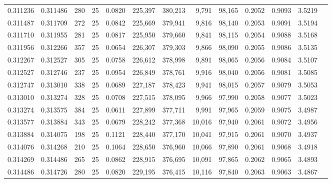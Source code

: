 \begin{tabular}{rrrrrrrrrrrrr}
0.311236 & 0.311486 &   280 &  25 &                                     0.0820 & 225,397 & 380,213 &   9,791 &  98,165 & 0.2052 & 0.9093 & 3.5219 \\
0.311487 & 0.311709 &   272 &  25 &                                     0.0842 & 225,669 & 379,941 &   9,816 &  98,140 & 0.2053 & 0.9091 & 3.5194 \\
0.311710 & 0.311955 &   281 &  25 &                                     0.0817 & 225,950 & 379,660 &   9,841 &  98,115 & 0.2054 & 0.9088 & 3.5168 \\
0.311956 & 0.312266 &   357 &  25 &                                     0.0654 & 226,307 & 379,303 &   9,866 &  98,090 & 0.2055 & 0.9086 & 3.5135 \\
0.312267 & 0.312527 &   305 &  25 &                                     0.0758 & 226,612 & 378,998 &   9,891 &  98,065 & 0.2056 & 0.9084 & 3.5107 \\
0.312527 & 0.312746 &   237 &  25 &                                     0.0954 & 226,849 & 378,761 &   9,916 &  98,040 & 0.2056 & 0.9081 & 3.5085 \\
0.312747 & 0.313010 &   338 &  25 &                                     0.0689 & 227,187 & 378,423 &   9,941 &  98,015 & 0.2057 & 0.9079 & 3.5053 \\
0.313010 & 0.313274 &   328 &  25 &                                     0.0708 & 227,515 & 378,095 &   9,966 &  97,990 & 0.2058 & 0.9077 & 3.5023 \\
0.313274 & 0.313575 &   384 &  25 &                                     0.0611 & 227,899 & 377,711 &   9,991 &  97,965 & 0.2059 & 0.9075 & 3.4987 \\
0.313577 & 0.313884 &   343 &  25 &                                     0.0679 & 228,242 & 377,368 &  10,016 &  97,940 & 0.2061 & 0.9072 & 3.4956 \\
0.313884 & 0.314075 &   198 &  25 &                                     0.1121 & 228,440 & 377,170 &  10,041 &  97,915 & 0.2061 & 0.9070 & 3.4937 \\
0.314076 & 0.314268 &   210 &  25 &                                     0.1064 & 228,650 & 376,960 &  10,066 &  97,890 & 0.2061 & 0.9068 & 3.4918 \\
0.314269 & 0.314486 &   265 &  25 &                                     0.0862 & 228,915 & 376,695 &  10,091 &  97,865 & 0.2062 & 0.9065 & 3.4893 \\
0.314486 & 0.314726 &   280 &  25 &                                     0.0820 & 229,195 & 376,415 &  10,116 &  97,840 & 0.2063 & 0.9063 & 3.4867 \\

\end{tabular}
